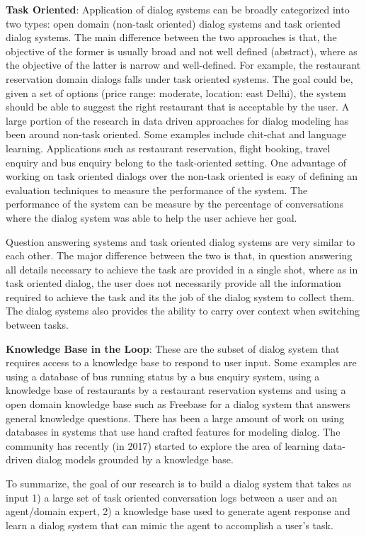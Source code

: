 \textbf{Task Oriented}: Application of dialog systems can be broadly categorized into two types: open domain (non-task oriented) dialog systems and task oriented dialog systems. The main difference between the two approaches is that, the objective of the former is usually broad and not well defined (abstract), where as the objective of the latter is  narrow and well-defined. For example, the restaurant reservation domain dialogs falls under task oriented systems. The goal could be, given a set of options (price range: moderate, location: east Delhi), the system should be able to suggest the right restaurant that is acceptable by the user. A large portion of the research in data driven approaches for dialog modeling has been around non-task oriented. Some examples include chit-chat and language learning. Applications such as restaurant reservation, flight booking, travel enquiry and bus enquiry belong to the task-oriented setting.  One advantage of working on task oriented dialogs over the non-task oriented is easy of defining an evaluation techniques to measure the performance of the system. The performance of the system can be measure by the percentage of conversations where the dialog system was able to help the user achieve her goal. 

Question answering systems and task oriented dialog systems are very similar to each other. The major difference between the two is that, in question answering all details necessary to achieve the task are provided in a single shot, where as in task oriented dialog, the user does not necessarily provide all the information required to achieve the task and its the job of the dialog system to collect them. The dialog systems also provides the ability to carry over context when switching between tasks.

\textbf{Knowledge Base in the Loop}: These are the subset of dialog system that requires access to a knowledge base to respond to user input. Some examples are  using a database of bus running status by a bus enquiry system, using a knowledge base of restaurants by a restaurant reservation systems and using a open domain knowledge base such as Freebase for a dialog system that answers general knowledge questions. There has been a large amount of work on using databases in systems that use hand crafted features for modeling dialog. The community has recently (in 2017) started to explore the area of learning data-driven dialog models grounded by a knowledge base.

To summarize, the goal of our research is to build a dialog system that takes as input 1) a large set of task oriented conversation logs between a user and an agent/domain expert, 2) a knowledge base used to generate agent response and learn a dialog system that can mimic the agent to accomplish a user's task.  

